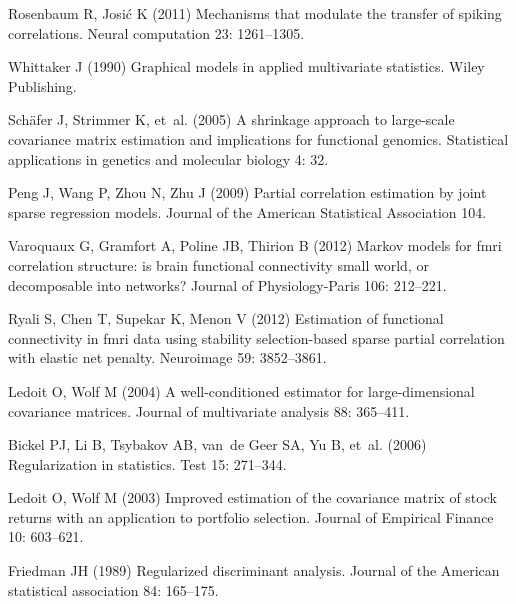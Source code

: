 \begin{thebibliography}{100}
Rosenbaum R, Josi{\'c} K (2011) Mechanisms that modulate the transfer of
  spiking correlations.
\newblock Neural computation 23: 1261--1305.

Whittaker J (1990) Graphical models in applied multivariate statistics.
\newblock Wiley Publishing.

Sch{\"a}fer J, Strimmer K, et~al. (2005) A shrinkage approach to large-scale
  covariance matrix estimation and implications for functional genomics.
\newblock Statistical applications in genetics and molecular biology 4: 32.

Peng J, Wang P, Zhou N, Zhu J (2009) Partial correlation estimation by joint
  sparse regression models.
\newblock Journal of the American Statistical Association 104.

Varoquaux G, Gramfort A, Poline JB, Thirion B (2012) Markov models for fmri
  correlation structure: is brain functional connectivity small world, or
  decomposable into networks?
\newblock Journal of Physiology-Paris 106: 212--221.

Ryali S, Chen T, Supekar K, Menon V (2012) Estimation of functional
  connectivity in fmri data using stability selection-based sparse partial
  correlation with elastic net penalty.
\newblock Neuroimage 59: 3852--3861.

Ledoit O, Wolf M (2004) A well-conditioned estimator for large-dimensional
  covariance matrices.
\newblock Journal of multivariate analysis 88: 365--411.

Bickel PJ, Li B, Tsybakov AB, van~de Geer SA, Yu B, et~al. (2006)
  Regularization in statistics.
\newblock Test 15: 271--344.

Ledoit O, Wolf M (2003) Improved estimation of the covariance matrix of stock
  returns with an application to portfolio selection.
\newblock Journal of Empirical Finance 10: 603--621.

Friedman JH (1989) Regularized discriminant analysis.
\newblock Journal of the American statistical association 84: 165--175.


\end{thebibliography}
